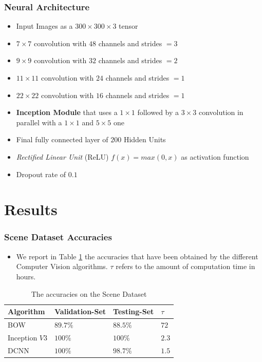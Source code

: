 \documentclass[a0, portrait]{IWIposter}
\begin{document}
\begin{multicols}{3}
\subsubsection*{Neural Architecture}
	\begin{itemize}
		\item Input Images as a $300 \times 300 \times 3$ tensor
		\item $7 \times 7$ convolution with $48$ channels and strides $= 3$
		\item $9 \times 9$ convolution with $32$ channels and strides $= 2$ 
		\item $11 \times 11$ convolution with $24$ channels and strides $= 1$ 
		\item $22 \times 22$ convolution with $16$ channels and strides $= 1$ 
		\item \textbf{Inception Module} that uses a $1 \times 1$ followed by a $3 \times 3$ convolution in parallel with a $1 \times 1$ and $5 \times 5$ one
		\item Final fully connected layer of $200$ Hidden Units
		\item \textit{Rectified Linear Unit} (ReLU) $f(x) = max(0,x)$ as activation function
		\item Dropout rate of $0.1$

	\end{itemize}


\section*{Results}

\centering
\subsubsection*{Scene Dataset Accuracies}

\begin{itemize}
	\item We report in Table \ref{tab:tab1} the accuracies that have been obtained by the different Computer Vision algorithms. $\tau$ refers to the amount of computation time in hours.
\end{itemize}

\begin{table}
\centering
\caption{The accuracies on the Scene Dataset}
\label{tab:tab1}
\begin{tabular}{>{\rowmac}l|>{\rowmac}l|>{\rowmac}l|>{\rowmac}l<{\clearrow}}
\textbf{Algorithm}   & \textbf{Validation-Set} & \textbf{Testing-Set} & \textbf{$\tau$}  \\ \hline
        BOW                    & $89.7\%$             & $88.5\%$           & $72$    \\
        Inception $V3$         & $100\%$              & $100\%$            & $2.3$     \\
        DCNN                   & $100\%$              & $98.7\%$           & $1.5$          \\
\end{tabular}\label{tab:tab1}
\end{table}


\end{multicols}
\end{document}
